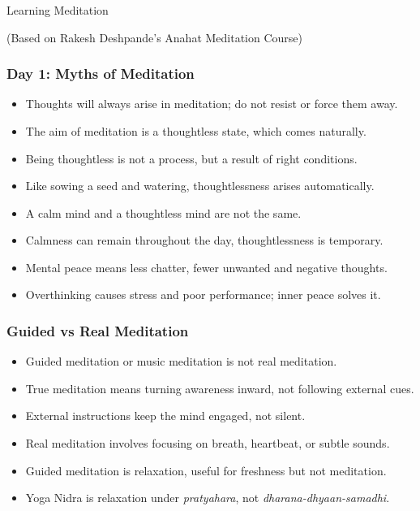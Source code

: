 \begin{frame}[fragile]\frametitle{}
\begin{center}
{\Large Learning Meditation}


{\tiny (Based on Rakesh Deshpande's Anahat Meditation Course)}
\end{center}
\end{frame}

\begin{frame}[fragile]\frametitle{Day 1: Myths of Meditation}
      \begin{itemize}
        \item Thoughts will always arise in meditation; do not resist or force them away.
        \item The aim of meditation is a thoughtless state, which comes naturally.
        \item Being thoughtless is not a process, but a result of right conditions.
        \item Like sowing a seed and watering, thoughtlessness arises automatically.
        \item A calm mind and a thoughtless mind are not the same.
        \item Calmness can remain throughout the day, thoughtlessness is temporary.
        \item Mental peace means less chatter, fewer unwanted and negative thoughts.
        \item Overthinking causes stress and poor performance; inner peace solves it.
      \end{itemize}
\end{frame}

\begin{frame}[fragile]\frametitle{Guided vs Real Meditation}
      \begin{itemize}
        \item Guided meditation or music meditation is not real meditation.
        \item True meditation means turning awareness inward, not following external cues.
        \item External instructions keep the mind engaged, not silent.
        \item Real meditation involves focusing on breath, heartbeat, or subtle sounds.
        \item Guided meditation is relaxation, useful for freshness but not meditation.
        \item Yoga Nidra is relaxation under \textit{pratyahara}, not \textit{dharana-dhyaan-samadhi}.
      \end{itemize}
\end{frame}

